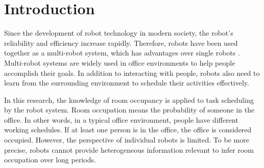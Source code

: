 





\chapter{Introduction}
Since the development of robot technology in modern society, the robot's reliability and efficiency increase rapidly. Therefore, robots have been used together as a multi-robot system, which has advantages over single robots \cite{Eijyne2020DevelopmentOA}. Multi-robot systems are widely used in office environments to help people accomplish their goals. In addition to interacting with people, robots also need to learn from the surrounding environment to schedule their activities effectively. 

In this research, the knowledge of room occupancy is applied to task scheduling by the robot system.  Room occupation means the probability of someone in the office. In other words, in a typical office environment, people have different working schedules. If at least one person is in the office, the office is considered occupied. However, the perspective of individual robots is limited\cite{PYO2015148}. To be more precise, robots cannot provide heterogeneous information relevant to infer room occupation over long periods.


